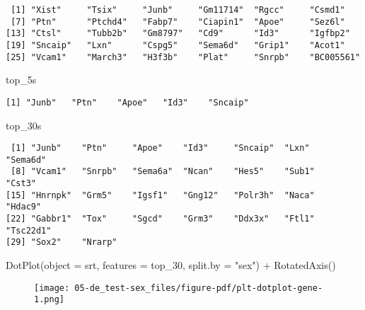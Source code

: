 \documentclass[
  letterpaper,
  DIV=11,
  numbers=noendperiod]{scrartcl}
\newenvironment{Shaded}{\begin{snugshade}}{\end{snugshade}}
\newcommand{\AttributeTok}[1]{\textcolor[rgb]{0.40,0.45,0.13}{#1}}
\newcommand{\FunctionTok}[1]{\textcolor[rgb]{0.28,0.35,0.67}{#1}}
\newcommand{\NormalTok}[1]{\textcolor[rgb]{0.00,0.23,0.31}{#1}}
\newcommand{\SpecialCharTok}[1]{\textcolor[rgb]{0.37,0.37,0.37}{#1}}
\newcommand{\StringTok}[1]{\textcolor[rgb]{0.13,0.47,0.30}{#1}}
\begin{document}
\begin{verbatim}
 [1] "Xist"     "Tsix"     "Junb"     "Gm11714"  "Rgcc"     "Csmd1"   
 [7] "Ptn"      "Ptchd4"   "Fabp7"    "Ciapin1"  "Apoe"     "Sez6l"   
[13] "Ctsl"     "Tubb2b"   "Gm8797"   "Cd9"      "Id3"      "Igfbp2"  
[19] "Sncaip"   "Lxn"      "Cspg5"    "Sema6d"   "Grip1"    "Acot1"   
[25] "Vcam1"    "March3"   "H3f3b"    "Plat"     "Snrpb"    "BC005561"
\end{verbatim}

\begin{Shaded}
\begin{Highlighting}[]
\NormalTok{top\_5s}
\end{Highlighting}
\end{Shaded}

\begin{verbatim}
[1] "Junb"   "Ptn"    "Apoe"   "Id3"    "Sncaip"
\end{verbatim}

\begin{Shaded}
\begin{Highlighting}[]
\NormalTok{top\_30s}
\end{Highlighting}
\end{Shaded}

\begin{verbatim}
 [1] "Junb"    "Ptn"     "Apoe"    "Id3"     "Sncaip"  "Lxn"     "Sema6d" 
 [8] "Vcam1"   "Snrpb"   "Sema6a"  "Ncan"    "Hes5"    "Sub1"    "Cst3"   
[15] "Hnrnpk"  "Grm5"    "Igsf1"   "Gng12"   "Polr3h"  "Naca"    "Hdac9"  
[22] "Gabbr1"  "Tox"     "Sgcd"    "Grm3"    "Ddx3x"   "Ftl1"    "Tsc22d1"
[29] "Sox2"    "Nrarp"  
\end{verbatim}

\begin{Shaded}
\begin{Highlighting}[]
\FunctionTok{DotPlot}\NormalTok{(}\AttributeTok{object =}\NormalTok{ srt, }\AttributeTok{features =}\NormalTok{ top\_30, }\AttributeTok{split.by =} \StringTok{"sex"}\NormalTok{) }\SpecialCharTok{+} \FunctionTok{RotatedAxis}\NormalTok{()}
\end{Highlighting}
\end{Shaded}

\begin{figure}[H]

{\centering \texttt{[image: 05-de\_test-sex\_files/figure-pdf/plt-dotplot-gene-1.png]}

}

\end{figure}
\end{document}
